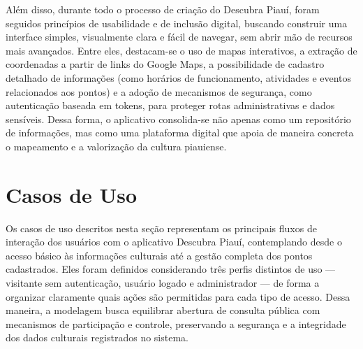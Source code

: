 Além disso, durante todo o processo de criação do Descubra Piauí, foram seguidos princípios de usabilidade e de inclusão digital, buscando construir uma interface simples, visualmente clara e fácil de navegar, sem abrir mão de recursos mais avançados. Entre eles, destacam-se o uso de mapas interativos, a extração de coordenadas a partir de links do Google Maps, a possibilidade de cadastro detalhado de informações (como horários de funcionamento, atividades e eventos relacionados aos pontos) e a adoção de mecanismos de segurança, como autenticação baseada em tokens, para proteger rotas administrativas e dados sensíveis. Dessa forma, o aplicativo consolida-se não apenas como um repositório de informações, mas como uma plataforma digital que apoia de maneira concreta o mapeamento e a valorização da cultura piauiense.


\section{Casos de Uso} \label{sec:casos}

Os casos de uso descritos nesta seção representam os principais fluxos de interação dos usuários com o aplicativo Descubra Piauí, contemplando desde o acesso básico às informações culturais até a gestão completa dos pontos cadastrados. Eles foram definidos considerando três perfis distintos de uso — visitante sem autenticação, usuário logado e administrador — de forma a organizar claramente quais ações são permitidas para cada tipo de acesso. Dessa maneira, a modelagem busca equilibrar abertura de consulta pública com mecanismos de participação e controle, preservando a segurança e a integridade dos dados culturais registrados no sistema.

